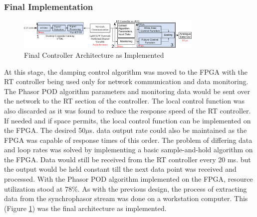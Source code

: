 \documentclass[conference]{IEEEtran}
\begin{document}
\subsubsection{Final Implementation}
\begin{figure}[htb]
\centering
\includegraphics[width=3.5in]{Final_RT_Arch.png} 
\vspace{-0.5em}
\caption{Final Controller Architecture as Implemented}
\label{Final_arch}
\end{figure}

At this stage, the damping control algorithm was moved to the FPGA with the RT controller being used only for network communication and data monitoring. The  Phasor POD algorithm parameters and monitoring data would be sent over the network to the RT section of the controller. The local control function was also discarded as it was found to reduce the response speed of the RT controller. If needed and if space permits, the local control function can be implemented on the FPGA. The desired 50$\mu$s. data output rate could also be maintained as the FPGA was capable of response times of this order. The problem of differing data and loop rates was solved by implementing a basic sample-and-hold algorithm on the FPGA. Data would still be received from the RT controller every 20 ms. but the output would be held constant till the next data point was received and processed. With the Phasor POD algorithm implemented on the FPGA, resource utilization stood at 78\%. As with the previous design, the process of extracting data from the synchrophasor stream was done on a workstation computer. This (Figure \ref{Final_arch}) was the final architecture as implemented. %
\end{document}
